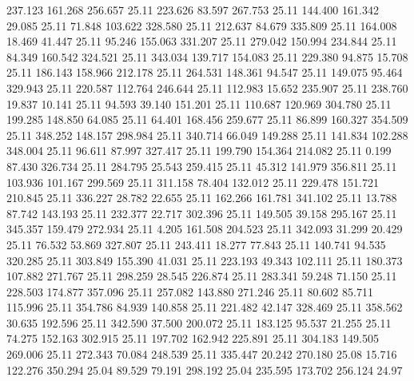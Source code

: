  237.123  161.268  256.657        25.11
 223.626   83.597  267.753        25.11
 144.400  161.342   29.085        25.11
  71.848  103.622  328.580        25.11
 212.637   84.679  335.809        25.11
 164.008   18.469   41.447        25.11
  95.246  155.063  331.207        25.11
 279.042  150.994  234.844        25.11
  84.349  160.542  324.521        25.11
 343.034  139.717  154.083        25.11
 229.380   94.875   15.708        25.11
 186.143  158.966  212.178        25.11
 264.531  148.361   94.547        25.11
 149.075   95.464  329.943        25.11
 220.587  112.764  246.644        25.11
 112.983   15.652  235.907        25.11
 238.760   19.837   10.141        25.11
  94.593   39.140  151.201        25.11
 110.687  120.969  304.780        25.11
 199.285  148.850   64.085        25.11
  64.401  168.456  259.677        25.11
  86.899  160.327  354.509        25.11
 348.252  148.157  298.984        25.11
 340.714   66.049  149.288        25.11
 141.834  102.288  348.004        25.11
  96.611   87.997  327.417        25.11
 199.790  154.364  214.082        25.11
   0.199   87.430  326.734        25.11
 284.795   25.543  259.415        25.11
  45.312  141.979  356.811        25.11
 103.936  101.167  299.569        25.11
 311.158   78.404  132.012        25.11
 229.478  151.721  210.845        25.11
 336.227   28.782   22.655        25.11
 162.266  161.781  341.102        25.11
  13.788   87.742  143.193        25.11
 232.377   22.717  302.396        25.11
 149.505   39.158  295.167        25.11
 345.357  159.479  272.934        25.11
   4.205  161.508  204.523        25.11
 342.093   31.299   20.429        25.11
  76.532   53.869  327.807        25.11
 243.411   18.277   77.843        25.11
 140.741   94.535  320.285        25.11
 303.849  155.390   41.031        25.11
 223.193   49.343  102.111        25.11
 180.373  107.882  271.767        25.11
 298.259   28.545  226.874        25.11
 283.341   59.248   71.150        25.11
 228.503  174.877  357.096        25.11
 257.082  143.880  271.246        25.11
  80.602   85.711  115.996        25.11
 354.786   84.939  140.858        25.11
 221.482   42.147  328.469        25.11
 358.562   30.635  192.596        25.11
 342.590   37.500  200.072        25.11
 183.125   95.537   21.255        25.11
  74.275  152.163  302.915        25.11
 197.702  162.942  225.891        25.11
 304.183  149.505  269.006        25.11
 272.343   70.084  248.539        25.11
 335.447   20.242  270.180        25.08
  15.716  122.276  350.294        25.04
  89.529   79.191  298.192        25.04
 235.595  173.702  256.124        24.97
